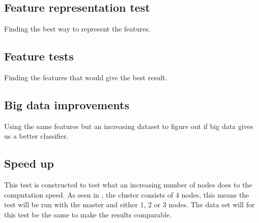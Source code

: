 \FloatBarrier
\subsection{Feature representation test}
Finding the best way to represent the features.  

\subsection{Feature tests}
Finding the features that would give the best result.

\subsection{Big data improvements}
Using the same features but an increasing dataset to figure out if big data gives us a better classifier.

\subsection{Speed up}
This test is constructed to test what an increasing number of nodes does to the computation speed. As seen in , the cluster consists of 4 nodes, this means the test will be run with the master and either 1, 2 or 3 nodes. The data set will for this test be the same to make the results comparable.










